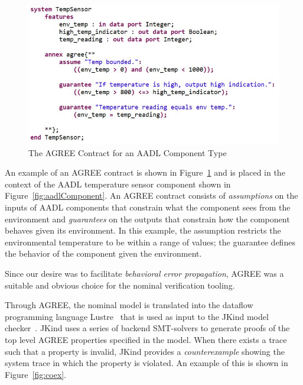 \begin{figure}[h!]
	\begin{center}
	\includegraphics[width=1.0\textwidth]{images/agreeContract2.JPG}
	\caption{The AGREE Contract for an AADL Component Type}
	\label{fig:agreeContract}
	\end{center}
\end{figure}

An example of an AGREE contract is shown in Figure~\ref{fig:agreeContract} and is placed in the context of the AADL temperature sensor component shown in Figure~\ref{fig:aadlComponent}.  An AGREE contract consists of {\em assumptions} on the inputs of AADL components that constrain what the component sees from the environment and {\em guarantees} on the outputs that constrain how the component behaves given its environment. In this example, the assumption restricts the environmental temperature to be within a range of values; the guarantee defines the behavior of the component given the environment. 

Since our desire was to facilitate {\em behavioral error propagation}, AGREE was a suitable and obvious choice for the nominal verification tooling. 

Through AGREE, the nominal model is translated into the dataflow programming language Lustre~\cite{Halbwachs91:IEEE} that is used as input to the JKind model checker~\cite{2017arXiv171201222G}. JKind uses a series of backend SMT-solvers to generate proofs of the top level AGREE properties specified in the model. When there exists a trace such that a property is invalid, JKind provides a {\em counterexample} showing the system trace in which the property is violated. An example of this is shown in Figure~\ref{fig:coex}. 

